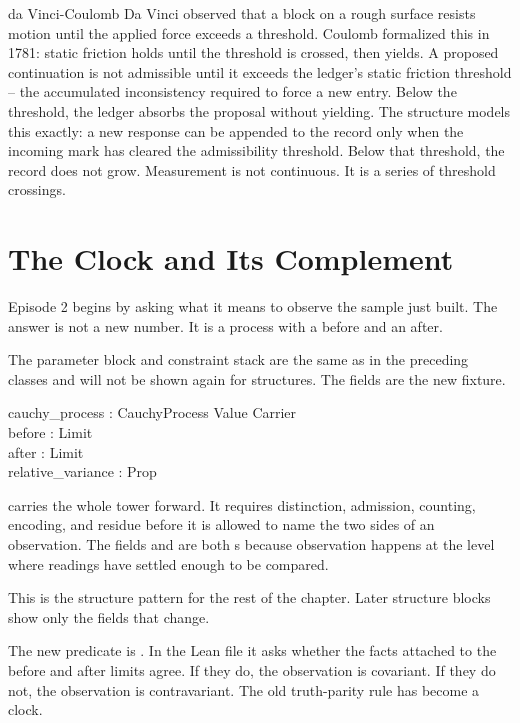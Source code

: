 \begin{gphenom}{da Vinci-Coulomb}
\label{ph:da-vinci-coulomb}
\GPhObs Da Vinci observed that a block on a rough surface resists motion
until the applied force exceeds a threshold. Coulomb formalized this in 1781:
static friction holds until the threshold is crossed, then yields.
\GPhCon A proposed continuation is not admissible until it exceeds the ledger's
static friction threshold -- the accumulated inconsistency required to force
a new entry. Below the threshold, the ledger absorbs the proposal without yielding.
\GPhSeq The  structure models this exactly: a new response can be
appended to the record only when the incoming mark has cleared the
admissibility threshold. Below that threshold, the record does not grow.
Measurement is not continuous. It is a series of threshold crossings.
\end{gphenom}

\section{The Clock and Its Complement}
\label{se:clock-and-complement}

Episode 2 begins by asking what it means to observe the sample just built. The
answer is not a new number. It is a process with a before and an after.

The parameter block and constraint stack are the same as in the preceding
classes and will not be shown again for structures. The fields are the new
fixture.

\begin{leancode}
\quad cauchy\_process : CauchyProcess Value Carrier\\
\quad before : Limit\\
\quad after : Limit\\
\quad relative\_variance : Prop
\end{leancode}

 carries the whole tower forward. It requires
distinction, admission, counting, encoding, and residue before it is allowed to
name the two sides of an observation. The fields  and
 are both s because observation happens at the level
where readings have settled enough to be compared.

This is the structure pattern for the rest of the chapter. Later structure
blocks show only the fields that change.

The new predicate is . In the Lean file it asks
whether the facts attached to the before and after limits agree. If they do,
the observation is covariant. If they do not, the observation is
contravariant. The old truth-parity rule has become a clock.

